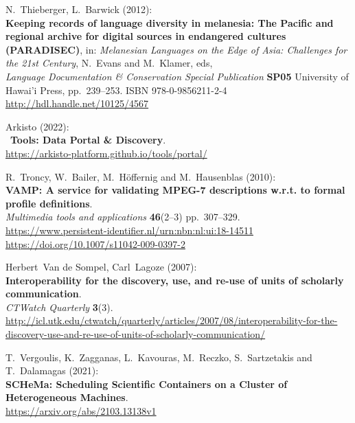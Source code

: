 \begin{thebibliography}{9}

N.~Thieberger, L.~Barwick (2012):\\
\textbf{Keeping records of language diversity in melanesia: The Pacific
and regional archive for digital sources in endangered cultures
(PARADISEC)}, in: \emph{Melanesian Languages on the Edge of Asia:
Challenges for the 21st Century}, N.~Evans and M.~Klamer, eds,\\
\emph{Language Documentation \& Conservation Special Publication}
\textbf{SP05} University of Hawai'i Press, pp.~239--253. ISBN
978-0-9856211-2-4\\
\url{http://hdl.handle.net/10125/4567}

\bibitem[Arkisto 2022]
Arkisto (2022):\\
~\textbf{Tools: Data Portal \& Discovery}.\\
\url{https://arkisto-platform.github.io/tools/portal/}

R.~Troncy, W.~Bailer, M.~Höffernig and M.~Hausenblas (2010):\\
\textbf{VAMP: A service for validating MPEG-7 descriptions w.r.t. to
formal profile definitions}.\\
\emph{Multimedia tools and applications} \textbf{46}(2--3)
pp.~307--329.\\
\url{https://www.persistent-identifier.nl/urn:nbn:nl:ui:18-14511}\\
\url{https://doi.org/10.1007/s11042-009-0397-2}

Herbert~Van de Sompel, Carl~Lagoze (2007):\\
\textbf{Interoperability for the discovery, use, and re-use of units of
scholarly communication}.\\
\emph{CTWatch Quarterly} \textbf{3}(3).\\
\url{http://icl.utk.edu/ctwatch/quarterly/articles/2007/08/interoperability-for-the-discovery-use-and-re-use-of-units-of-scholarly-communication/}

T.~Vergoulis, K.~Zagganas, L.~Kavouras, M.~Reczko,
S.~Sartzetakis and T.~Dalamagas (2021):\\
\textbf{SCHeMa: Scheduling Scientific Containers on a Cluster of
Heterogeneous Machines}.\\
\url{https://arxiv.org/abs/2103.13138v1}


\end{thebibliography}
